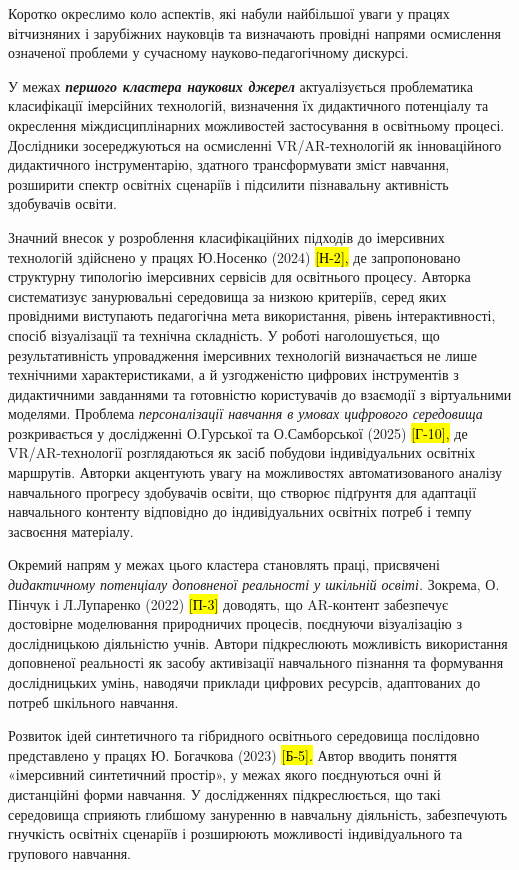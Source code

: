 Коротко окреслимо коло аспектів, які набули найбільшої уваги у працях вітчизняних і зарубіжних науковців та визначають провідні напрями осмислення означеної проблеми у сучасному науково-педагогічному дискурсі.

У межах \emph{\textbf{першого кластера наукових джерел}} актуалізується проблематика класифікації імерсійних технологій, визначення їх дидактичного потенціалу та окреслення міждисциплінарних можливостей застосування в освітньому процесі. Дослідники зосереджуються на осмисленні VR/AR-технологій як інноваційного дидактичного інструментарію, здатного трансформувати зміст навчання, розширити спектр освітніх сценаріїв і підсилити пізнавальну активність здобувачів освіти.

Значний внесок у розроблення класифікаційних підходів до імерсивних технологій здійснено у працях Ю.Носенко (2024) \hl{{[}Н-2{]},} де запропоновано структурну типологію імерсивних сервісів для освітнього процесу. Авторка систематизує занурювальні середовища за низкою критеріїв, серед яких провідними виступають педагогічна мета використання, рівень інтерактивності, спосіб візуалізації та технічна складність. У роботі наголошується, що результативність упровадження імерсивних технологій визначається не лише технічними характеристиками, а й узгодженістю цифрових інструментів з дидактичними завданнями та готовністю користувачів до взаємодії з віртуальними моделями. Проблема \emph{персоналізації навчання в умовах цифрового середовища} розкривається у дослідженні О.Гурської та О.Самборської (2025) \hl{{[}Г-10{]},} де VR/AR-технології розглядаються як засіб побудови індивідуальних освітніх маршрутів. Авторки акцентують увагу на можливостях автоматизованого аналізу навчального прогресу здобувачів освіти, що створює підґрунтя для адаптації навчального контенту відповідно до індивідуальних освітніх потреб і темпу засвоєння матеріалу.

Окремий напрям у межах цього кластера становлять праці, присвячені \emph{дидактичному потенціалу доповненої реальності у шкільній освіті.} Зокрема, О. Пінчук і Л.Лупаренко (2022) \hl{{[}П-3{]}} доводять, що AR-контент забезпечує достовірне моделювання природничих процесів, поєднуючи візуалізацію з дослідницькою діяльністю учнів. Автори підкреслюють можливість використання доповненої реальності як засобу активізації навчального пізнання та формування дослідницьких умінь, наводячи приклади цифрових ресурсів, адаптованих до потреб шкільного навчання.

Розвиток ідей синтетичного та гібридного освітнього середовища послідовно представлено у працях Ю. Богачкова (2023) \hl{{[}Б-5{]}.} Автор вводить поняття «імерсивний синтетичний простір», у межах якого поєднуються очні й дистанційні форми навчання. У дослідженнях підкреслюється, що такі середовища сприяють глибшому зануренню в навчальну діяльність, забезпечують гнучкість освітніх сценаріїв і розширюють можливості індивідуального та групового навчання.

